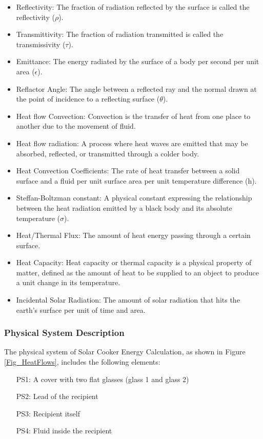 \documentclass[12pt]{article}
\begin{document}
\begin{itemize}

\item Reflectivity: The fraction of radiation reflected by the surface is called the reflectivity ($\rho$). 
\item Transmittivity: The fraction of radiation transmitted is called the transmissivity ($\tau$).
\item Emittance: The energy radiated by the surface of a body per second per unit area ($\epsilon$).
\item Reflactor Angle: The angle between a reflected ray and the normal drawn at the point of incidence to a reflecting surface ($\theta$).
\item Heat flow Convection: Convection is the transfer of heat from one place to another due to the movement of fluid. 
\item Heat flow radiation: A process where heat waves are emitted that may be absorbed, reflected, or transmitted through a colder body.
\item Heat Convection Coefficients: The rate of heat transfer between a solid surface and a fluid per unit surface area per unit temperature difference (h). 
\item Steffan-Boltzman constant: A physical constant expressing the relationship between the heat radiation emitted by a black body and its absolute temperature ($\sigma$).
\item Heat/Thermal Flux: The amount of heat energy passing through a certain surface.
\item Heat Capacity: Heat capacity or thermal capacity is a physical property of matter, defined as the amount of heat to be supplied to an object to produce a unit change in its temperature. 
\item Incidental Solar Radiation: The amount of solar radiation that hits the earth’s surface per unit of time and area. 


\end{itemize}

\subsubsection{Physical System Description} \label{sec_phySystDescrip}

The physical system of Solar Cooker
Energy Calculation, as shown in Figure \ref{Fig_HeatFlows},
includes the following elements:


\begin{itemize}

\item[PS1:] A cover with two flat glasses (glass 1 and glass 2) 

\item[PS2:] Lead of the recipient 

\item[PS3:] Recipient itself

\item[PS4:] Fluid inside the recipient

\end{itemize}
\end{document}
